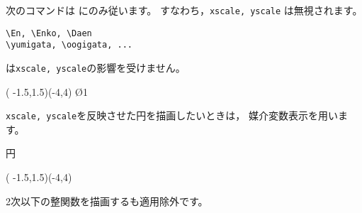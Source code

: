 \documentclass[a4j]{jarticle}
\begin{document}
次のコマンドは にのみ従います。
すなわち，\verb/xscale, yscale/ は無視されます。
\begin{jquote}
\begin{verbatim}
\En, \Enko, \Daen
\yumigata, \oogigata, ...
\end{verbatim}
\end{jquote}

は\verb/xscale, yscale/の影響を受けません。

\begin{showEx}{}
\begin{zahyou}[%
ul=8mm,xscale=2,yscale=.5](%
-1.5,1.5)(-4,4)
\zahyouMemori[g]
\En\O{1}
\end{zahyou}
\end{showEx}

\verb/xscale, yscale/を反映させた円を描画したいときは，
媒介変数表示を用います。

\begin{showEx}{円}
\begin{zahyou}[%
ul=8mm,xscale=2,yscale=.5](%
-1.5,1.5)(-4,4)
\zahyouMemori[g]
\end{zahyou}
\end{showEx}

2次以下の整関数を描画するも適用除外です。
\end{document}
